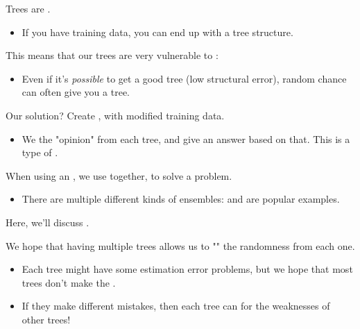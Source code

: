         \begin{concept}
            Trees are .

            \begin{itemize}
                \item If you have  training data, you can end up with a  tree structure.
            \end{itemize}

            This means that our trees are very vulnerable to : 
            
            \begin{itemize}
                \item Even if it's \textit{possible} to get a good tree (low structural error), random chance can often give you a  tree.
            \end{itemize}
        \end{concept}

        Our solution? Create , with modified training data. 

        \begin{itemize}
            \item We  the "opinion" from each tree, and give an answer based on that. This is a type of .\\
        \end{itemize}

        \begin{definition}
            When using an , we use  together, to solve a problem.

            \begin{itemize}
                \item There are multiple different kinds of ensembles:  and  are popular examples.
            \end{itemize}
        \end{definition}

        Here, we'll discuss .

        \subsecdiv

        We hope that having multiple trees allows us to "" the randomness from each one.

        \begin{itemize}
            \item Each tree might have some estimation error problems, but we hope that most trees don't make the .

            \item If they make different mistakes, then each tree can  for the weaknesses of other trees!
        \end{itemize}


